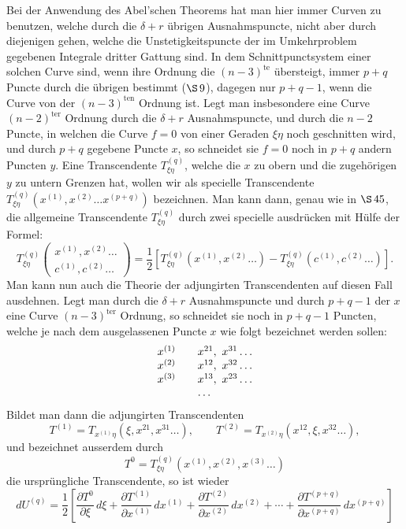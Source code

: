 \documentclass[10pt]{article}
\begin{document}
Bei der Anwendung des Abel'schen Theorems hat man hier immer Curven zu benutzen, welche durch die \(\delta+r\) übrigen Ausnahmspuncte, nicht aber durch diejenigen gehen, welche die Unstetigkeitspuncte der im Umkehrproblem gegebenen Integrale dritter Gattung sind. In dem Schnittpunctsystem einer solchen Curve sind, wenn ihre Ordnung die \((n-3)^{\mathrm{te}}\) übersteigt, immer \(p+q\) Puncte durch die übrigen bestimmt (\(\S\,9\)), dagegen nur \(p+q-1\), wenn die Curve von der \((n-3)^{\mathrm{ten}}\) Ordnung ist. Legt man insbesondere eine Curve \((n-2)^{\mathrm{ter}}\) Ordnung durch die \(\delta+r\) Ausnahmspuncte, und durch die \(n-2\) Puncte, in welchen die Curve \(f=0\) von einer Geraden \(\xi\eta\) noch geschnitten wird, und durch \(p+q\) gegebene Puncte \(x\), so schneidet sie \(f=0\) noch in \(p+q\) andern Puncten \(y\). Eine Transcendente \(T_{\xi\eta}^{(q)}\), welche die \(x\) zu obern und die zugehörigen \(y\) zu untern Grenzen hat, wollen wir als specielle Transcendente \(T_{\xi\eta}^{(q)}(x^{(1)},x^{(2)}\ldots x^{(p+q)})\) bezeichnen. Man kann dann, genau wie in \(\S\,45\), die allgemeine Transcendente \(T_{\xi\eta}^{(q)}\) durch zwei specielle ausdrücken mit Hülfe der Formel:
\[
T_{\xi\eta}^{(q)}
\begin{pmatrix}
x^{(1)},x^{(2)}\ldots\\
c^{(1)},c^{(2)}\ldots
\end{pmatrix}
=\frac12\left[
T_{\xi\eta}^{(q)}(x^{(1)},x^{(2)}\ldots)
-
T_{\xi\eta}^{(q)}(c^{(1)},c^{(2)}\ldots)
\right].
\]
Man kann nun auch die Theorie der adjungirten Transcendenten auf diesen Fall ausdehnen. Legt man durch die \(\delta+r\) Ausnahmspuncte und durch \(p+q-1\) der \(x\) eine Curve \((n-3)^{\mathrm{ter}}\) Ordnung, so schneidet sie noch in \(p+q-1\) Puncten, welche je nach dem ausgelassenen Puncte \(x\) wie folgt bezeichnet werden sollen:
\[
\begin{array}{c@{\qquad}l}
x^{(1)}&x^{21},\ x^{31}\ldots\\
x^{(2)}&x^{12},\ x^{32}\ldots\\
x^{(3)}&x^{13},\ x^{23}\ldots\\
&\ldots
\end{array}
\]
Bildet man dann die adjungirten Transcendenten
\[
T^{(1)}=T_{x^{(1)}\eta}(\xi,x^{21},x^{31}\ldots),
\qquad
T^{(2)}=T_{x^{(2)}\eta}(x^{12},\xi,x^{32}\ldots),
\]
und bezeichnet ausserdem durch
\[
T^0=T_{\xi\eta}^{(q)}(x^{(1)},x^{(2)},x^{(3)}\ldots)
\]
die ursprüngliche Transcendente, so ist wieder
\[
dU^{(q)}=\frac12\left[
\frac{\partial T^0}{\partial\xi}\,d\xi
+\frac{\partial T^{(1)}}{\partial x^{(1)}}\,dx^{(1)}
+\frac{\partial T^{(2)}}{\partial x^{(2)}}\,dx^{(2)}
+\cdots+
\frac{\partial T^{(p+q)}}{\partial x^{(p+q)}}\,dx^{(p+q)}
\right]
\]
\end{document}
